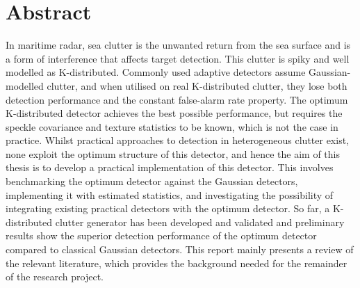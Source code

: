 \chapter*{Abstract}
In maritime radar, sea clutter is the unwanted return from the sea surface and is a form of interference that affects target detection. This clutter is spiky and well modelled as K-distributed. Commonly used adaptive detectors assume Gaussian-modelled clutter, and when utilised on real K-distributed clutter, they lose both detection performance and the constant false-alarm rate property. The optimum K-distributed detector achieves the best possible performance, but requires the speckle covariance and texture statistics to be known, which is not the case in practice. Whilst practical approaches to detection in heterogeneous clutter exist, none exploit the optimum structure of this detector, and hence the aim of this thesis is to develop a practical implementation of this detector. This involves benchmarking the optimum detector against the Gaussian detectors, implementing it with estimated statistics, and investigating the possibility of integrating existing practical detectors with the optimum detector. So far, a K-distributed clutter generator has been developed and validated and preliminary results show the superior detection performance of the optimum detector compared to classical Gaussian detectors. This report mainly presents a review of the relevant literature, which provides the background needed for the remainder of the research project.